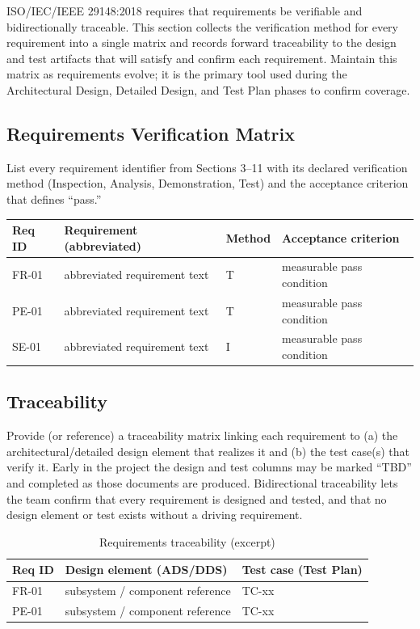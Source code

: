 ISO/IEC/IEEE 29148:2018 \cite{ISO29148} requires that requirements be verifiable and bidirectionally traceable. This section collects the verification method for every requirement into a single matrix and records forward traceability to the design and test artifacts that will satisfy and confirm each requirement. Maintain this matrix as requirements evolve; it is the primary tool used during the Architectural Design, Detailed Design, and Test Plan phases to confirm coverage.

\subsection{Requirements Verification Matrix}
List every requirement identifier from Sections 3--11 with its declared verification method (Inspection, Analysis, Demonstration, Test) and the acceptance criterion that defines ``pass.''

\begin{longtable}{ | p{1.6cm} | p{6.2cm} | p{1.6cm} | p{3.2cm} |}
\hline
\textbf{Req ID} & \textbf{Requirement (abbreviated)} & \textbf{Method} & \textbf{Acceptance criterion} \\ \hline
\endhead
FR-01 & abbreviated requirement text & T & measurable pass condition \\ \hline
PE-01 & abbreviated requirement text & T & measurable pass condition \\ \hline
SE-01 & abbreviated requirement text & I & measurable pass condition \\ \hline
\end{longtable}

\subsection{Traceability}
Provide (or reference) a traceability matrix linking each requirement to (a) the architectural/detailed design element that realizes it and (b) the test case(s) that verify it. Early in the project the design and test columns may be marked ``TBD'' and completed as those documents are produced. Bidirectional traceability lets the team confirm that every requirement is designed and tested, and that no design element or test exists without a driving requirement.

\begin{table}[H]
\caption{Requirements traceability (excerpt)}
\begin{center}
    \begin{tabular}{ | p{1.6cm} | p{4.5cm} | p{4.5cm} |}
    \hline
    \textbf{Req ID} & \textbf{Design element (ADS/DDS)} & \textbf{Test case (Test Plan)} \\ \hline
    FR-01 & subsystem / component reference & TC-xx \\ \hline
    PE-01 & subsystem / component reference & TC-xx \\ \hline
    \end{tabular}
\end{center}
\end{table}
